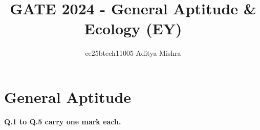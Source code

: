 



\title{GATE 2024 - General Aptitude \& Ecology (EY)}
\author{ee25btech11005-Aditya Mishra}
\maketitle

{\let\newpage\relax\maketitle}

\renewcommand{\thefigure}{\theenumi}
\renewcommand{\thetable}{\theenumi}
\setlength{\intextsep}{10pt} 

\section*{\textbf{General Aptitude}}
\textbf{Q.1 to Q.5 carry one mark each.}
 
